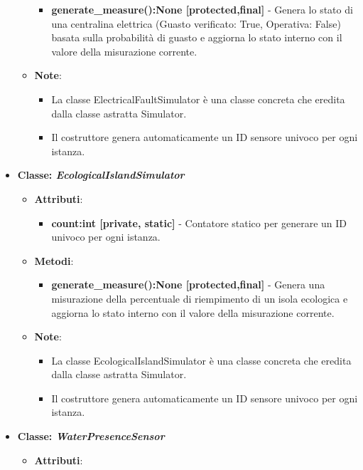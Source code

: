 \begin{itemize}
\begin{itemize}
\begin{itemize}
        \item \textbf{generate\_measure():None [protected,final]} - Genera lo stato di una centralina elettrica (Guasto verificato: True, Operativa: False) basata sulla probabilità di guasto e aggiorna lo stato interno con il valore della misurazione corrente.
    \end{itemize}
    \item   \textbf{Note}:
    \begin{itemize}
        \item La classe ElectricalFaultSimulator è una classe concreta che eredita dalla classe astratta Simulator.
        \item Il costruttore genera automaticamente un ID sensore univoco per ogni istanza.
    \end{itemize}
\end{itemize}
    \item{\textbf{Classe: \textit{EcologicalIslandSimulator}}}
    \begin{itemize}
        \item    \textbf{Attributi}: 
    \begin{itemize}
        \item \textbf{count:int [private, static]} - Contatore statico per generare un ID univoco per ogni istanza.
    \end{itemize}
    \item    \textbf{Metodi}: 
    \begin{itemize}
        \item \textbf{generate\_measure():None [protected,final]} - Genera una misurazione della percentuale di riempimento di un isola ecologica e aggiorna lo stato interno con il valore della misurazione corrente.
    \end{itemize}
    \item    \textbf{Note}:
    \begin{itemize}
        \item La classe EcologicalIslandSimulator è una classe concreta che eredita dalla classe astratta Simulator.
        \item Il costruttore genera automaticamente un ID sensore univoco per ogni istanza.
    \end{itemize}
\end{itemize}
    \item{\textbf{Classe: \textit{WaterPresenceSensor}}}
    \begin{itemize}
        \item    \textbf{Attributi}: 

\end{itemize}
\end{itemize}
